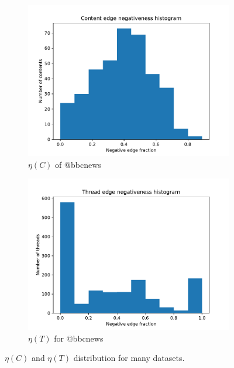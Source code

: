 \begin{figure}
\begin{center}
		\begin{subfigure}[b]{0.4\textwidth}
			\centering
			\includegraphics[width=\textwidth]{tex/out/bbcnews500/neg-fraction-content-hist.pdf}
			\caption{$\eta(C)$ of @bbcnews}
			\label{fig:CNN-content-eta}
		\end{subfigure}
		\begin{subfigure}[b]{0.4\textwidth}
			\centering
			\includegraphics[width=\textwidth]{tex/out/bbcnews500/neg-fraction-thread-hist.pdf}
			\caption{$\eta(T)$ for @bbcnews}
			\label{fig:CNN-thread-eta}
		\end{subfigure}
		\caption{$\eta(C)$ and $\eta(T)$ distribution for many datasets.}
		\label{fig:eta-content-thread}
	\end{center}
\end{figure}

